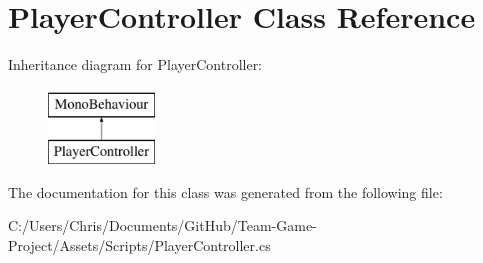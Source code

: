 \hypertarget{class_player_controller}{}\section{Player\+Controller Class Reference}
\label{class_player_controller}
Inheritance diagram for Player\+Controller\+:\begin{figure}[H]
\begin{center}
\leavevmode
\includegraphics[height=2.000000cm]{class_player_controller}
\end{center}
\end{figure}


The documentation for this class was generated from the following file\+:\begin{DoxyCompactItemize}
\item 
C\+:/\+Users/\+Chris/\+Documents/\+Git\+Hub/\+Team-\/\+Game-\/\+Project/\+Assets/\+Scripts/Player\+Controller.\+cs\end{DoxyCompactItemize}
